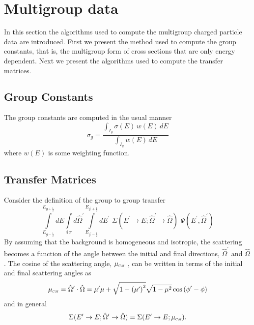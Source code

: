 \section{Multigroup data}
In this section the algorithms used to compute the multigroup charged particle data are introduced. First we present the method used to compute the group constants, that is, the multigroup form of cross sections that are only energy dependent. Next we present the algorithms used to compute the transfer matrices.

\subsection{Group Constants}
The group constants are computed in the usual manner
\begin{equation}
  \sigma_g = \dfrac{\int_{I_g} \sigma(E) \, w(E) \, dE}{\int_{I_g} w(E) \, dE}
\end{equation}
where $w(E)$ is some weighting function.

\subsection{Transfer Matrices}
Consider the definition of the group to group transfer
\begin{equation} \label{eqn:g2g_transfer}
  \int\limits_{E_{g-\frac{1}{2}}}^{E_{g+\frac{1}{2}}} dE \int\limits_{4 \, \pi} d\hat{\Omega}^{\prime} \int\limits_{E_{g^{\prime}-\frac{1}{2}}}^{E_{g^{\prime}+\frac{1}{2}}} dE^{\prime} \,\, \Sigma(E^{\prime}\rightarrow E; \hat{\Omega}^{\prime} \rightarrow \hat{\Omega}) \,\, \Psi(E^{\prime},\hat{\Omega}^{\prime})
\end{equation}
By assuming that the background is homogeneous and isotropic, the scattering becomes a function of the angle between the initial and final directions, $\hat{\Omega}^{\prime}$ and $\hat{\Omega}$. The cosine of the scattering angle, $\mucm$ , can be written in terms of the initial and final scattering angles as
\begin{equation}
 \mucm = \hat{\Omega}^{\prime} \cdot \hat{\Omega} = \mu^{\prime} \mu + \sqrt{1-\left(\mu^{\prime}\right)^2} \sqrt{1-\mu^{2}} \cos\left(\phi^{\prime} - \phi \right) 
\end{equation}
and in general
\begin{equation} \label{eqn:mucm_dxs}
  \Sigma(E^{\prime}\rightarrow E; \hat{\Omega}^{\prime} \rightarrow \hat{\Omega}) = \Sigma(E^{\prime}\rightarrow E; \mucm).
\end{equation}

